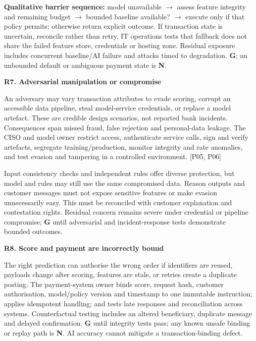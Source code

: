 \documentclass[11pt,a4paper]{article}
\newcommand{\sub}[1]{\par\vspace{2mm}\textbf{\color{ink}#1}\par}
\newcommand{\src}[1]{{\small[#1]}}
\newcommand{\risk}[2]{\sub{#1. #2}}
\begin{document}
\textbf{Qualitative barrier sequence:} model unavailable $\rightarrow$ assess feature integrity and remaining budget $\rightarrow$ bounded baseline available? $\rightarrow$ execute only if that policy permits; otherwise return explicit outcome. If transaction state is uncertain, reconcile rather than retry. IT operations tests that fallback does not share the failed feature store, credentials or hosting zone. Residual exposure includes concurrent baseline/AI failure and attacks timed to degradation. \textbf{G}; an unbounded default or ambiguous payment state is \textbf{N}.
\risk{R7}{Adversarial manipulation or compromise}
An adversary may vary transaction attributes to evade scoring, corrupt an accessible data pipeline, steal model-service credentials, or replace a model artefact. These are credible design scenarios, not reported bank incidents. Consequences span missed fraud, false rejection and personal-data leakage. The CISO and model owner restrict access, authenticate service calls, sign and verify artefacts, segregate training/production, monitor integrity and rate anomalies, and test evasion and tampering in a controlled environment. \src{P05, P06}

Input consistency checks and independent rules offer diverse protection, but model and rules may still use the same compromised data. Reason outputs and customer messages must not expose sensitive features or make evasion unnecessarily easy. This must be reconciled with customer explanation and contestation rights. Residual concern remains severe under credential or pipeline compromise; \textbf{G} until adversarial and incident-response tests demonstrate bounded outcomes.
\risk{R8}{Score and payment are incorrectly bound}
The right prediction can authorise the wrong order if identifiers are reused, payloads change after scoring, features are stale, or retries create a duplicate posting. The payment-system owner binds score, request hash, customer authorisation, model/policy version and timestamp to one immutable instruction; applies idempotent handling; and tests late responses and reconciliation across systems. Counterfactual testing includes an altered beneficiary, duplicate message and delayed confirmation. \textbf{G} until integrity tests pass; any known unsafe binding or replay path is \textbf{N}. AI accuracy cannot mitigate a transaction-binding defect.
\end{document}
